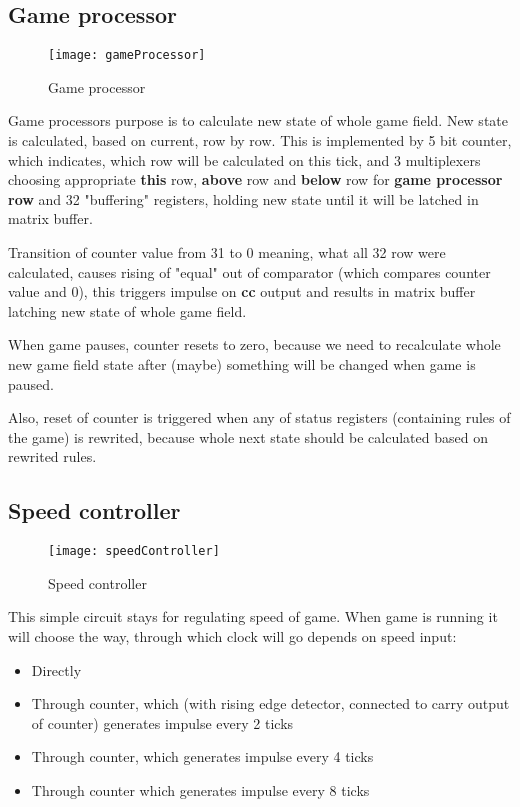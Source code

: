 \subsection*{Game processor}

\begin{figure}[ht]
	\centering
	\texttt{[image: gameProcessor]}
	\caption{Game processor}
\end{figure}

Game processors purpose is to calculate new state of whole game field. New state is calculated, based on current, row by row. This is implemented by 5 bit counter, which indicates, which row will be calculated on this tick, and 3 multiplexers choosing appropriate \textbf{this} row, \textbf{above} row and \textbf{below} row for \textbf{game processor row} and 32 "buffering" registers, holding new state until it will be latched in matrix buffer.

Transition of counter value from 31 to 0 meaning, what all 32 row were calculated, causes rising of "equal" out of comparator (which compares counter value and 0), this triggers impulse on \textbf{cc} output and results in matrix buffer latching new state of whole game field.

When game pauses, counter resets to zero, because we need to recalculate whole new game field state after (maybe) something will be changed when game is paused. 

Also, reset of counter is triggered when any of status registers (containing rules of the game) is rewrited, because whole next state should be calculated based on rewrited rules.

\clearpage
\subsection*{Speed controller}

\begin{figure}[ht]
	\centering
	\texttt{[image: speedController]}
	\caption{Speed controller}
\end{figure}

This simple circuit stays for regulating speed of game. When game is running it will choose the way, through which clock will go depends on speed input:

\begin{itemize}
	\item Directly 
	\item Through counter, which (with rising edge detector, connected to carry output of counter) generates impulse every 2 ticks
	\item Through counter, which generates impulse every 4 ticks
	\item Through counter which generates impulse every 8 ticks
\end{itemize}

